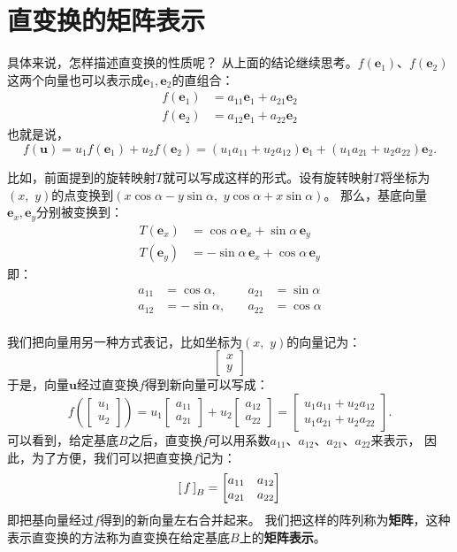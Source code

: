 \documentclass[12pt,UTF8]{ctexbook}
\begin{document}
\section{直变换的矩阵表示}

具体来说，怎样描述直变换的性质呢？
从上面的结论继续思考。$f(\mathbf{e}_1)$、$f(\mathbf{e}_2)$这两个向量也可以表示成$\mathbf{e}_1, \mathbf{e}_2$的直组合：
\begin{align*}
    f(\mathbf{e}_1) &= a_{11} \mathbf{e}_1 + a_{21} \mathbf{e}_2  \\
    f(\mathbf{e}_2) &= a_{12} \mathbf{e}_1 + a_{22} \mathbf{e}_2 
\end{align*}
也就是说，
$$ f(\mathbf{u}) = u_1 f(\mathbf{e}_1) + u_2 f(\mathbf{e}_2) = (u_1a_{11} + u_2a_{12}) \mathbf{e}_1 + (u_1a_{21} + u_2a_{22}) \mathbf{e}_2.$$

比如，前面提到的旋转映射$T$就可以写成这样的形式。设有旋转映射$T$将坐标为$(x,\,\, y)$的点变换到$(x\cos{\alpha} - y\sin{\alpha},\,\,y\cos{\alpha} + x\sin{\alpha})$。
那么，基底向量$\mathbf{e}_x, \mathbf{e}_y$分别被变换到：
\begin{align*}
    T(\mathbf{e}_x) &= \cos{\alpha}\,\mathbf{e}_x + \sin{\alpha}\,\mathbf{e}_y  \\
    T(\mathbf{e}_y) &= -\sin{\alpha}\,\mathbf{e}_x + \cos{\alpha}\,\mathbf{e}_y  
\end{align*}
即：
$$
\begin{array}{rlrl}
    a_{11} &= \cos{\alpha}, \quad & a_{21} &= \sin{\alpha} \\
    a_{12} &= -\sin{\alpha}, \quad & a_{22} &= \cos{\alpha} \\
\end{array}
$$

我们把向量用另一种方式表记，比如坐标为$(x, \,\,y)$的向量记为：
$$ \begin{bmatrix}
    x\\ y
\end{bmatrix}$$
于是，向量$\mathbf{u}$经过直变换$f$得到新向量可以写成：
$$ f\left(\begin{bmatrix}
    u_1\\ u_2
\end{bmatrix}\right) = u_1\begin{bmatrix}
    a_{11}\\ a_{21}
\end{bmatrix} + u_2 \begin{bmatrix}
    a_{12}\\ a_{22}
\end{bmatrix} = \begin{bmatrix}
    u_1a_{11} + u_2a_{12}\\ u_1a_{21} + u_2a_{22} 
\end{bmatrix}.$$
可以看到，给定基底$B$之后，直变换$f$可以用系数$a_{11}$、$a_{12}$、$a_{21}$、$a_{22}$来表示，
因此，为了方便，我们可以把直变换$f$记为：
$$
\bmat{f}[B] = 
\begin{bmatrix}
    a_{11} & a_{12} \\ a_{21} & a_{22}
\end{bmatrix}
$$
即把基向量经过$f$得到的新向量左右合并起来。
我们把这样的阵列称为\textbf{矩阵}，这种表示直变换的方法称为直变换在给定基底$B$上的\textbf{矩阵表示}。
\end{document}
